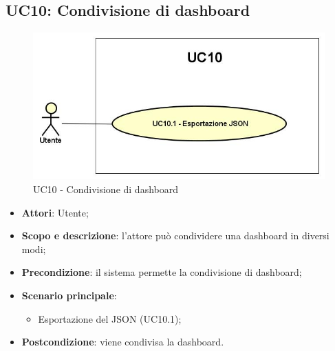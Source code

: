 \subsection{UC10: Condivisione di dashboard}
\hypertarget{UC10}{}
\begin{figure} [H]
	\centering
	\includegraphics[scale=0.5]{Img/UC10}
	\caption{UC10 - Condivisione di dashboard}\label{}
\end{figure}
\begin{itemize}
	\item \textbf{Attori}: Utente;
	\item \textbf{Scopo e descrizione}: l'attore può condividere una dashboard in diversi modi;
	\item \textbf{Precondizione}: il sistema permette la condivisione di dashboard;
	\item \textbf{Scenario principale}: 
	\begin{itemize}
		\item Esportazione del JSON (UC10.1);
	\end{itemize}
	\item \textbf{Postcondizione}: viene condivisa la dashboard.
\end{itemize}

